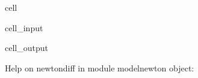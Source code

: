 \documentclass[letterpaper,10pt,english]{jupyterBook}
\begin{document}
\begin{sphinxuseclass}{cell}\begin{sphinxVerbatimInput}

\begin{sphinxuseclass}{cell_input}
\begin{sphinxVerbatim}[commandchars=\\\{\}]
\end{sphinxVerbatim}

\end{sphinxuseclass}\end{sphinxVerbatimInput}
\begin{sphinxVerbatimOutput}

\begin{sphinxuseclass}{cell_output}
\begin{sphinxVerbatim}[commandchars=\\\{\}]
Help on newton\PYGZus{}diff in module modelnewton object:


\end{sphinxVerbatim}
\end{sphinxuseclass}
\end{sphinxVerbatimOutput}
\end{sphinxuseclass}
\end{document}
